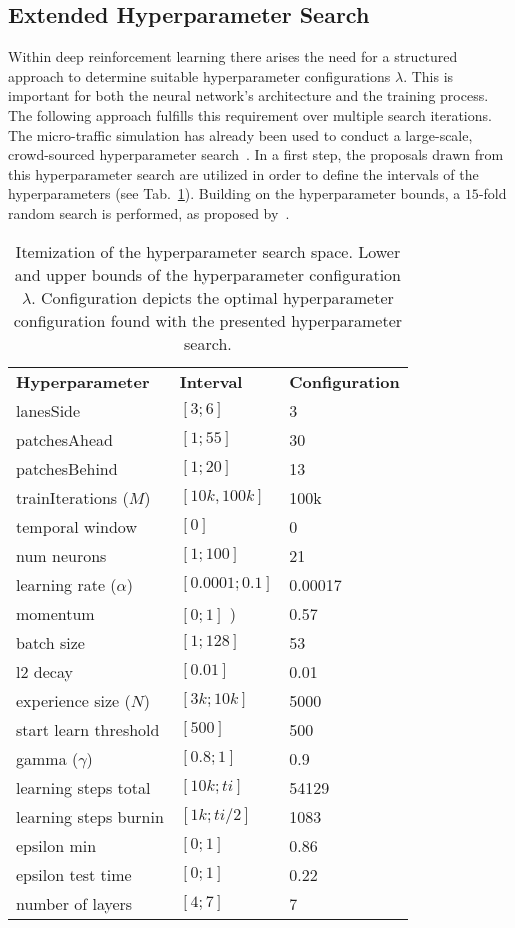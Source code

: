 \documentclass{article}
\begin{document}
\subsection{Extended Hyperparameter Search}
\label{ch:Hyperparametersearch}
Within deep reinforcement learning there arises the need for a structured approach to determine suitable hyperparameter configurations $\lambda$. This is important for both the neural network's architecture and the training process. The following approach fulfills this requirement over multiple search iterations. The micro-traffic simulation has already been used to conduct a large-scale, crowd-sourced hyperparameter search~\cite{FRIDMAN.2018}. In a first step, the proposals drawn from this hyperparameter search are utilized in order to define the intervals of the hyperparameters (see Tab.~\ref{tab:Hyperparameter}). Building on the hyperparameter bounds, a $15$-fold random search is performed, as proposed by~\cite{RANDOM.2012,GOODFELLOW.2016}.  

\begin{table}[ht]
	\centering
	\caption{Itemization of the hyperparameter search space. Lower and upper bounds of the hyperparameter configuration $\lambda$. Configuration depicts the optimal hyperparameter configuration found with the presented hyperparameter search.}
	\begin{tabular*}{\columnwidth}{p{}p{}p{}}
		\textbf{Hyperparameter}     & \textbf{Interval} & \textbf{Configuration} \\
		lanesSide					& $[3; 6]$      &					3\\
		patchesAhead 				& $[1; 55]$     &					30\\
		patchesBehind 				& $[1; 20]$     &					13\\
		trainIterations ($M$) 		& $[10k, 100k]$ &					100k\\
	    temporal window 			& $[0]$         &					0\\
		num neurons					& $[1; 100]$    &					21\\
		learning rate ($\alpha$)    & $[0.0001; 0.1]$ &					0.00017\\
		momentum					& $[0;1]$ )     &					0.57\\
		batch size 					& $[1; 128]$    &					53\\
		l2 decay 					& $[0.01]$      &					0.01\\
		experience size ($N$) 		& $[3k; 10k]$   &					5000\\
		start learn threshold 		& $[500]$       &					500\\
		gamma ($\gamma$)			& $[0.8; 1]$    &					0.9\\
		learning steps total 		& $[10k; ti]$ &					54129\\
		learning steps burnin 		& $[1k; ti/2]$&					1083\\
		epsilon min 				& $[0; 1]$ &					0.86\\
		epsilon test time 			& $[0; 1]$ &					0.22\\
		number of layers 			& $[4;7]$  &					7\\
	\end{tabular*}
	\label{tab:Hyperparameter}
\end{table}
\end{document}
